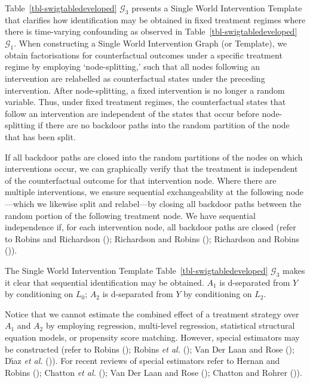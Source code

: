 \documentclass[
  single column]{article}
\begin{document}
Table~\ref{tbl-swigtabledeveloped} \(\mathcal{G}_3\) presents a Single
World Intervention Template that clarifies how identification may be
obtained in fixed treatment regimes where there is time-varying
confounding as observed in Table~\ref{tbl-swigtabledeveloped}
\(\mathcal{G}_1\). When constructing a Single World Intervention Graph
(or Template), we obtain factorisations for counterfactual outcomes
under a specific treatment regime by employing `node-splitting,' such
that all nodes following an intervention are relabelled as
counterfactual states under the preceding intervention. After
node-splitting, a fixed intervention is no longer a random variable.
Thus, under fixed treatment regimes, the counterfactual states that
follow an intervention are independent of the states that occur before
node-splitting if there are no backdoor paths into the random partition
of the node that has been split.

If all backdoor paths are closed into the random partitions of the nodes
on which interventions occur, we can graphically verify that the
treatment is independent of the counterfactual outcome for that
intervention node. Where there are multiple interventions, we ensure
sequential exchangeability at the following node---which we likewise
split and relabel---by closing all backdoor paths between the random
portion of the following treatment node. We have sequential independence
if, for each intervention node, all backdoor paths are closed (refer to
Robins and Richardson ();
Richardson and Robins ();
Richardson and Robins ()).

The Single World Intervention Template
Table~\ref{tbl-swigtabledeveloped} \(\mathcal{G}_3\) makes it clear that
sequential identification may be obtained. \(A_1\) is d-separated from
\(Y\) by conditioning on \(L_0\); \(A_2\) is d-separated from \(Y\) by
conditioning on \(L_2\).

Notice that we cannot estimate the combined effect of a treatment
strategy over \(A_1\) and \(A_2\) by employing regression, multi-level
regression, statistical structural equation models, or propensity score
matching. However, special estimators may be constructed (refer to
Robins (); Robins \emph{et al.}
(); Van Der Laan and Rose
(); Dı́az \emph{et al.}
()). For recent reviews of
special estimators refer to Hernan and Robins
(); Chatton \emph{et al.}
(); Van Der Laan and Rose
(); Chatton and Rohrer
()).
\end{document}
